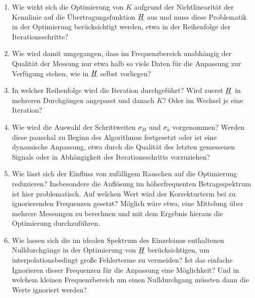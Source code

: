 \documentclass[../Report.tex]{subfiles}
\begin{document}
\begin{enumerate}
	\item 	Wie wirkt sich die Optimierung von $K$ aufgrund der Nichtlinearität der Kennlinie auf die Übertragungsfunktion $\underline{H}$ aus und muss diese Problematik in der Optimierung berücksichtigt werden, etwa in der Reihenfolge der Iterationsschritte?
	
	\item	Wie wird damit umgegangen, dass im Frequenzbereich unabhängig der Qualität der Messung nur etwa halb so viele Daten für die Anpassung zur Verfügung stehen, wie in $\underline{H}$ selbst vorliegen?
	
	
	\item	In welcher Reihenfolge wird die Iteration durchgeführt? Wird zuerst $\underline{H}$ in mehreren Durchgängen angepasst und danach $K$? Oder im Wechsel je eine Iteration?
	
	\item 	Wie wird die Auswahl der Schrittweiten $\sigma_H$ und $\sigma_a$ vorgenommen? Werden diese pauschal zu Beginn des Algorithmus festgesetzt oder ist eine dynamische Anpassung, etwa durch die Qualität des letzten gemessenen Signals oder in Abhängigkeit des Iterationsschritts vorzuziehen? 
	
	\item 	Wie lässt sich der Einfluss von zufälligem Rauschen auf die Optimierung reduzieren? Insbesondere die Auflösung im höherfrequenten Betragsspektrum ist hier problematisch. Auf welchen Wert wird der Korrekturterm bei zu ignorierenden Frequenzen gesetzt? Möglich wäre etwa, eine Mittelung über mehrere Messungen zu berechnen und mit dem Ergebnis hieraus die Optimierung durchzuführen.
	
	\item	Wie lassen sich die im idealen Spektrum des Einzelsinus enthaltenen Nulldurchgänge in der Optimierung von $\underline{H}$ berücksichtigen, um interpolationsbedingt große Fehlerterme zu vermeiden? Ist das einfache Ignorieren dieser Frequenzen für die Anpassung eine Möglichkeit? Und in welchem kleinen Frequenzbereich um einen Nulldurchgang müssten dann die Werte ignoriert werden?
	
	

\end{enumerate}
\end{document}
